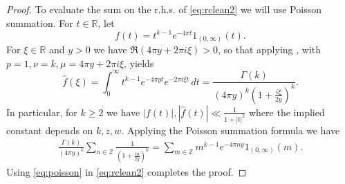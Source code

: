 \documentclass[12pt, a4paper]{amsart}
\theoremstyle{definition}
\newcommand {\1} {\mathbf{1}}
\numberwithin{equation}{section}
\begin{document}
\begin{proof}
 To evaluate the sum on the r.h.s. of \eqref{eq:rclean2} we will use Poisson summation. For $t\in \mathbb R$, let
\[
f(t)=t^{k-1} e^{-4\pi t} 1_{(0,\infty)}(t).
\]
For $\xi \in \mathbb R$ and $y>0$ we have $\Re(4\pi y+2\pi i\xi)>0$, so that applying \cite[Equation 3.478.1]{gradshteyn-ryzhik-2014}, with $p=1,\nu=k,\mu=4\pi y+2\pi i\xi$, yields
\[
\widehat f(\xi)=\int_0^{\infty} t^{k-1 } e^{-4\pi y t} e^{-2\pi i \xi t}\, dt=\frac{\Gamma(k)}{(4\pi y)^k(1+\frac{i\xi}{2y})^k}.
\]
In particular, for $k \ge 2$ we have $|f(t)|,|\widehat f(t)| \ll \frac{1}{1+|t|^2}$ where the implied constant depends on $k,z,w$.
Applying the Poisson summation formula we have
\begin{equation} \label{eq:poisson}
\begin{split}
 \frac{\Gamma(k)}{(4\pi y)^k}\sum_{n \in \mathbb Z} \frac{1}{(1+\frac{in}{2y})^{k}}=
\sum_{m \in \mathbb Z} m^{k-1} e^{-4\pi ny} 1_{(0,\infty)}(m).
\end{split}
\end{equation}
Using \eqref{eq:poisson} in \eqref{eq:rclean2} completes the proof.
\end{proof}
\end{document}
